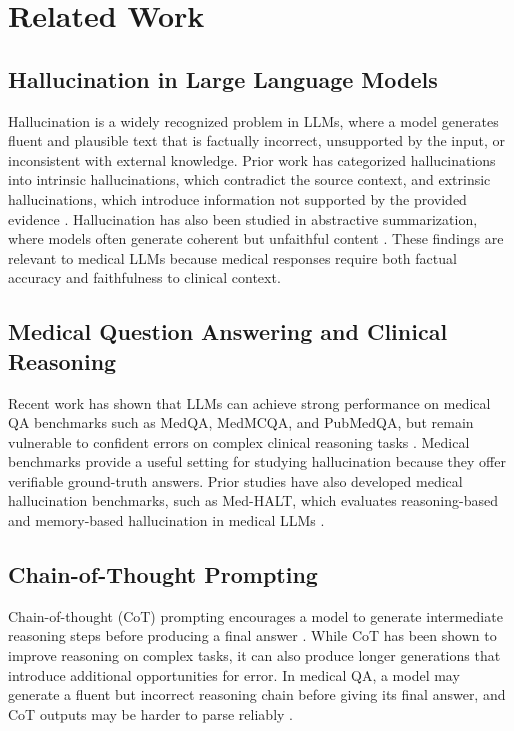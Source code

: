 \documentclass[11pt]{article}
\begin{document}
\section{Related Work}

\subsection{Hallucination in Large Language Models}
Hallucination is a widely recognized problem in LLMs, where a model 
generates fluent and plausible text that is factually incorrect, 
unsupported by the input, or inconsistent with external knowledge. Prior 
work has categorized hallucinations into intrinsic hallucinations, which 
contradict the source context, and extrinsic hallucinations, which 
introduce information not supported by the provided evidence 
\cite{ji2023survey}. Hallucination has also been studied in abstractive 
summarization, where models often generate coherent but unfaithful 
content \cite{maynez2020faithfulness}. These findings are relevant to 
medical LLMs because medical responses require both factual accuracy and 
faithfulness to clinical context.

\subsection{Medical Question Answering and Clinical Reasoning}
Recent work has shown that LLMs can achieve strong performance on 
medical QA benchmarks such as MedQA, MedMCQA, and PubMedQA, but remain 
vulnerable to confident errors on complex clinical reasoning tasks 
\cite{lievin2024medical}. Medical benchmarks provide a useful setting 
for studying hallucination because they offer verifiable ground-truth 
answers. Prior studies have also developed medical hallucination 
benchmarks, such as Med-HALT, which evaluates reasoning-based and 
memory-based hallucination in medical LLMs \cite{pal2023medhalt}.

\subsection{Chain-of-Thought Prompting}
Chain-of-thought (CoT) prompting encourages a model to generate 
intermediate reasoning steps before producing a final answer 
\cite{wei2022chain}. While CoT has been shown to improve reasoning 
on complex tasks, it can also produce longer generations that introduce 
additional opportunities for error. In medical QA, a model may generate 
a fluent but incorrect reasoning chain before giving its final answer, 
and CoT outputs may be harder to parse reliably \cite{wang2023selfconsistency}.
\end{document}
